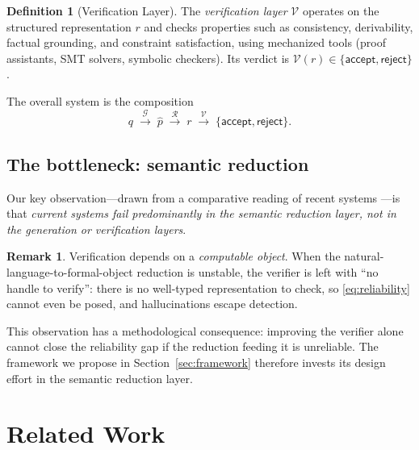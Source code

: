 \documentclass[11pt,a4paper]{article}
\theoremstyle{definition}
\newtheorem{definition}{Definition}[section]
\newtheorem{remark}{Remark}[section]
\theoremstyle{plain}
\begin{document}
\begin{definition}[Verification Layer]
The \emph{verification layer} $\mathcal{V}$ operates on the structured representation $r$ and checks
properties such as consistency, derivability, factual grounding, and constraint satisfaction, using
mechanized tools (proof assistants, SMT solvers, symbolic checkers). Its verdict is
$\mathcal{V}(r) \in \{\mathsf{accept},\mathsf{reject}\}$.
\end{definition}

The overall system is the composition
\begin{equation}
  \label{eq:pipeline}
  q \;\xrightarrow{\;\mathcal{G}\;}\; \hat{p} \;\xrightarrow{\;\mathcal{R}\;}\; r
  \;\xrightarrow{\;\mathcal{V}\;}\; \{\mathsf{accept},\mathsf{reject}\}.
\end{equation}

\subsection{The bottleneck: semantic reduction}
\label{sec:bottleneck}

Our key observation---drawn from a comparative reading of recent systems
\cite{hubert2026,trinh2024,romera2024,wagner2021}---is that \emph{current systems fail predominantly in
the semantic reduction layer, not in the generation or verification layers}.

\begin{remark}
Verification depends on a \emph{computable object}. When the natural-language-to-formal-object
reduction is unstable, the verifier is left with ``no handle to verify'': there is no well-typed
representation to check, so \eqref{eq:reliability} cannot even be posed, and hallucinations escape
detection.
\end{remark}

This observation has a methodological consequence: improving the verifier alone cannot close the
reliability gap if the reduction feeding it is unreliable. The framework we propose in
Section~\ref{sec:framework} therefore invests its design effort in the semantic reduction layer.

\section{Related Work}
\label{sec:related}
\end{document}
